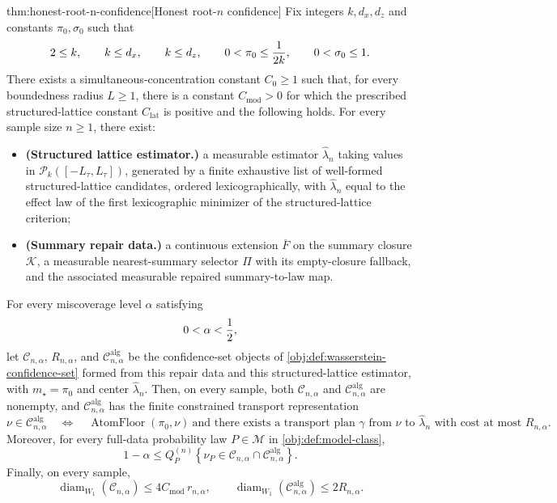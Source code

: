 \begin{theoremv}{thm:honest-root-n-confidence}[Honest root-\(n\) confidence]
Fix integers \(k,d_x,d_z\) and constants \(\pi_0,\sigma_0\) such that
\[
2\le k,\qquad k\le d_x,\qquad k\le d_z,\qquad
0<\pi_0\le {1\over 2k},\qquad 0<\sigma_0\le 1 .
\]
There exists a simultaneous-concentration constant \(C_0\ge 1\) such that, for every boundedness radius \(L\ge 1\), there is a constant \(C_{\mathrm{mod}}>0\) for which the prescribed structured-lattice constant \(C_{\mathrm{lat}}\) is positive and the following holds.  For every sample size \(n\ge 1\), there exist:
\begin{itemize}
\item \textbf{(Structured lattice estimator.)} a measurable estimator \(\widehat\lambda_n\) taking values in \(\mathcal P_k([-L_\tau,L_\tau])\), generated by a finite exhaustive list of well-formed structured-lattice candidates, ordered lexicographically, with \(\widehat\lambda_n\) equal to the effect law of the first lexicographic minimizer of the structured-lattice criterion;
\item \textbf{(Summary repair data.)} a continuous extension \(\overline F\) on the summary closure \(\mathcal K\), a measurable nearest-summary selector \(\Pi\) with its empty-closure fallback, and the associated measurable repaired summary-to-law map.
\end{itemize}
For every miscoverage level \(\alpha\) satisfying
\[
0<\alpha< {1\over 2},
\]
let \(\mathcal C_{n,\alpha}\), \(R_{n,\alpha}\), and \(\mathcal C^{\mathrm{alg}}_{n,\alpha}\) be the confidence-set objects of \cref{obj:def:wasserstein-confidence-set} formed from this repair data and this structured-lattice estimator, with \(m_\star=\pi_0\) and center \(\widehat\lambda_n\).  Then, on every sample, both \(\mathcal C_{n,\alpha}\) and \(\mathcal C^{\mathrm{alg}}_{n,\alpha}\) are nonempty, and \(\mathcal C^{\mathrm{alg}}_{n,\alpha}\) has the finite constrained transport representation
\[
\nu\in\mathcal C^{\mathrm{alg}}_{n,\alpha}
\quad\Longleftrightarrow\quad
\operatorname{AtomFloor}(\pi_0,\nu)\ \text{and there exists a transport plan }\gamma\text{ from }\nu\text{ to }\widehat\lambda_n
\text{ with cost at most }R_{n,\alpha}.
\]
Moreover, for every full-data probability law \(P\in\mathcal M\) in \cref{obj:def:model-class},
\[
1-\alpha
\le
Q_P^{(n)}
\left\{
\nu_P\in\mathcal C_{n,\alpha}\cap\mathcal C^{\mathrm{alg}}_{n,\alpha}
\right\}.
\]
Finally, on every sample,
\[
\operatorname{diam}_{W_1}(\mathcal C_{n,\alpha})
\le
4C_{\mathrm{mod}}\, r_{n,\alpha},
\qquad
\operatorname{diam}_{W_1}(\mathcal C^{\mathrm{alg}}_{n,\alpha})
\le
2R_{n,\alpha}.
\]
\end{theoremv}

